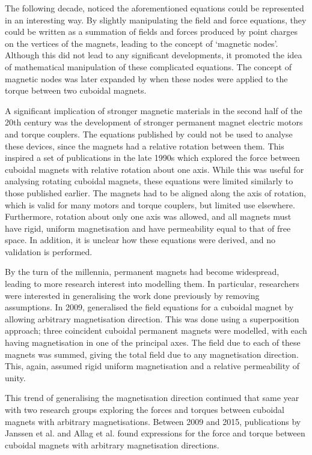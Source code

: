 The following decade, \textcite{Bancel1999} noticed the aforementioned equations could be represented in an interesting way. By slightly manipulating the field and force equations, they could be written as a summation of fields and forces produced by point charges on the vertices of the magnets, leading to the concept of `magnetic nodes'. Although this did not lead to any significant developments, it promoted the idea of mathematical manipulation of these complicated equations. The concept of magnetic nodes was later expanded by \textcite{Yonnet2011} when these nodes were applied to the torque between two cuboidal magnets.

A significant implication of stronger magnetic materials in the second half of the 20th century was the development of stronger permanent magnet electric motors and torque couplers. The equations published by \textcite{Akoun1984} could not be used to analyse these devices, since the magnets had a relative rotation between them. This inspired a set of publications in the late 1990s \cite{Charpentier1999,Charpentier1999a,Elies1998,Elies1999} which explored the force between cuboidal magnets with relative rotation about one axis. While this was useful for analysing rotating cuboidal magnets, these equations were limited similarly to those published earlier. The magnets had to be aligned along the axis of rotation, which is valid for many motors and torque couplers, but limited use elsewhere. Furthermore, rotation about only one axis was allowed, and all magnets must have rigid, uniform magnetisation and have permeability equal to that of free space. In addition, it is unclear how these equations were derived, and no validation is performed.

By the turn of the millennia, permanent magnets had become widespread, leading to more research interest into modelling them. In particular, researchers were interested in generalising the work done previously by removing assumptions. In 2009, \textcite{Ravaud2009} generalised the field equations for a cuboidal magnet by allowing arbitrary magnetisation direction. This was done using a superposition approach; three coincident cuboidal permanent magnets were modelled, with each having magnetisation in one of the principal axes. The field due to each of these magnets was summed, giving the total field due to any magnetisation direction. This, again, assumed rigid uniform magnetisation and a relative permeability of unity.

This trend of generalising the magnetisation direction continued that same year with two research groups exploring the forces and torques between cuboidal magnets with arbitrary magnetisations. Between 2009 and 2015, publications by Janssen et al. \cite{Janssen2009a,Janssen2010,Janssen2011} and Allag et al. \cite{Allag2009,Allag2009a,Allag2009b,Allag2015} found expressions for the force and torque between cuboidal magnets with arbitrary magnetisation directions.

